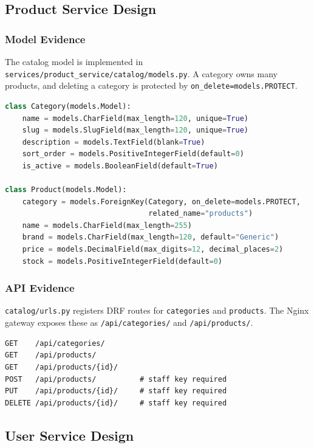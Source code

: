 \documentclass[12pt,a4paper]{article}
\newcommand{\codepath}[1]{{\small\texttt{#1}}}
\begin{document}
\subsection{Product Service Design}

\subsubsection{Model Evidence}

The catalog model is implemented in \codepath{services/product\_service/catalog/models.py}. A category owns many products, and deleting a category is protected by \codepath{on\_delete=models.PROTECT}.

\begin{lstlisting}[language=Python,caption={Real product service model excerpt.}]
class Category(models.Model):
    name = models.CharField(max_length=120, unique=True)
    slug = models.SlugField(max_length=120, unique=True)
    description = models.TextField(blank=True)
    sort_order = models.PositiveIntegerField(default=0)
    is_active = models.BooleanField(default=True)

class Product(models.Model):
    category = models.ForeignKey(Category, on_delete=models.PROTECT,
                                 related_name="products")
    name = models.CharField(max_length=255)
    brand = models.CharField(max_length=120, default="Generic")
    price = models.DecimalField(max_digits=12, decimal_places=2)
    stock = models.PositiveIntegerField(default=0)
\end{lstlisting}

\subsubsection{API Evidence}

\codepath{catalog/urls.py} registers DRF routes for \codepath{categories} and \codepath{products}. The Nginx gateway exposes these as \codepath{/api/categories/} and \codepath{/api/products/}.

\begin{lstlisting}[caption={Product service API routes.}]
GET    /api/categories/
GET    /api/products/
GET    /api/products/{id}/
POST   /api/products/          # staff key required
PUT    /api/products/{id}/     # staff key required
DELETE /api/products/{id}/     # staff key required
\end{lstlisting}

\subsection{User Service Design}
\end{document}
